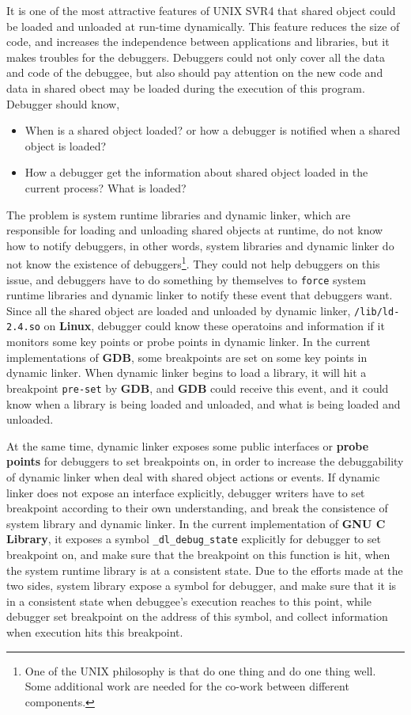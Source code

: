 \documentclass[12pt]{book}
\begin{document}
\begin{CJK}{UTF8}{gbsn}
It is one of the most attractive features of UNIX SVR4 that shared object could be loaded and unloaded at run-time dynamically.  This feature reduces the size
of code, and increases the independence between applications and libraries, but it makes troubles for the debuggers.  Debuggers could not only
cover all the data and code of the debuggee, but also should pay attention on the new code and data in shared obect may be loaded during the execution of this program.
Debugger should know,
\begin{itemize}
\item When is a shared object loaded? or how a debugger is notified when a shared object is loaded?
\item How a debugger get the information about shared object loaded in the current process? What is loaded?
\end{itemize}

The problem is system runtime libraries and dynamic linker, which are responsible for loading and unloading shared objects at runtime, do not know how to notify debuggers,
in other words, system libraries and dynamic linker do not know the existence of debuggers\footnote{One of the UNIX philosophy is that do one thing and do one thing well.  
Some additional work are needed for the co-work between different components.}.  They could not help debuggers on this issue, and debuggers
have to do something by themselves to \texttt{force} system runtime libraries and dynamic linker to notify these event that debuggers want.  
Since all the shared object are loaded and unloaded by dynamic linker, \texttt{/lib/ld-2.4.so} on \textbf{Linux}, debugger
could know these operatoins and information if it monitors some key points or probe points in dynamic linker.
In the current implementations of \textbf{GDB}, some breakpoints are set on some key points in dynamic linker.
When dynamic linker begins to load a library, it will hit a breakpoint \texttt{pre-set} by \textbf{GDB}, 
and \textbf{GDB} could receive this event, and it could know when a library is being loaded and unloaded, and what is being loaded and unloaded.

At the same time, dynamic linker exposes some public interfaces or \textbf{probe points} for debuggers to set breakpoints on, in order to increase the debuggability 
of dynamic linker when deal with shared object actions or events.  If dynamic linker does not expose an interface explicitly, debugger writers have to set breakpoint 
according to their own
understanding, and break the consistence of system library and dynamic linker.  In the current implementation of \textbf{GNU C Library}, it exposes
a symbol \texttt{\_dl\_debug\_state} explicitly for debugger to set breakpoint on, and make sure that the breakpoint on this function is hit, 
when the system runtime library is at a consistent state.  Due to the efforts made at the two sides, system library expose a symbol for debugger, and make sure that
it is in a consistent state when debuggee's execution reaches to this point, while debugger set breakpoint on the address of this symbol, 
and collect information when execution hits this breakpoint.


\end{CJK}
\end{document}
